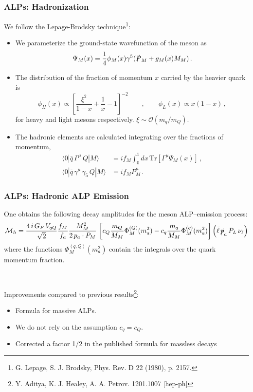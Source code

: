 \documentclass[mathserif, 10pt]{beamer}
\begin{document}
\begin{frame}\frametitle{ALPs: Hadronization}
    We follow the Lepage-Brodsky technique\footnote[18]{G. Lepage, S. J. Brodsky, Phys. Rev. D 22 (1980), p. 2157.}:
    \begin{itemize}
        \item We parameterize the ground-state wavefunction of the meson as
              $$\Psi_M(x)=\frac{1}{4}\phi_M(x)\gamma^5(\slashed{P}_M + g_M(x) M_M)\,.$$
        \item The distribution of the fraction of momentum $x$ carried by the heavier quark is
              $$\phi_H(x) \propto  \left[\frac{\xi^2}{1-x}+\frac{1}{x}-1\right]^{-2} \qquad , \qquad \phi_L(x) \propto  x(1-x) \,,$$
              for heavy and light mesons respectively. $\xi\sim \mathcal{O}(m_q/m_Q)$.
        \item The hadronic elements are calculated integrating over the fractions of momentum,
              \begin{align*}
                  \langle 0| \bar{q}\,\Gamma^{\mu}\,Q |M\rangle          & = i f_M \int_0^1 dx\,\mathrm{Tr}\left[\Gamma^{\mu} \Psi_M (x)\right]\,, \\
                  \langle 0|\bar{q}\,\gamma^\mu \,\gamma_5 \,Q |M\rangle & = i f_M P_M^\mu \,.
              \end{align*}

    \end{itemize}
\end{frame}

\begin{frame}\frametitle{ALPs: Hadronic ALP Emission}
    One obtains the following decay amplitudes for the meson ALP--emission process:
    {\small $$\mathcal{M}_{h} = \frac{4\,i\,G_F\,V_{qQ}}{\sqrt{2}} \frac{f_M}{f_a} \frac{M_M^2}{2\,p_a \cdot P_M} \,
        \left[ c_Q \frac{m_Q}{M_M} \Phi^{(Q)}_M(m_a^2) - c_q \frac{m_q}{M_M} \Phi^{(q)}_M (m_a^2) \right]
        \left(\bar{\ell} \, \slashed{p}_a \,P_L \, \nu_\ell \right)$$}
    where the functions $\Phi^{(q,Q)}_M (m_a^2)$ contain the integrals over the quark momentum fraction.

    ~

    Improvements compared to previous results\footnote[19]{Y. Aditya, K. J. Healey, A. A. Petrov. 1201.1007 [hep-ph]}:
    \begin{itemize}
        \item Formula for massive ALPs.
        \item We do not rely on the assumption $c_q = c_Q$.
        \item Corrected a factor 1/2 in the published formula for massless decays
    \end{itemize}

\end{frame}
\end{document}
